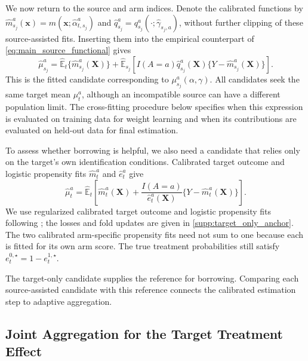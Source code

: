 \documentclass[12pt]{article}
\providecommand{\En}{\widehat{\mathbb E}}
\begin{document}
We now return to the source and arm indices. Denote the calibrated functions by $\widehat m_{s_j}^a(\boldsymbol x)=m(\boldsymbol x;\widehat{\alpha}_{t,s_j}^a)$ and $\widehat q_{s_j}^a=q_{s_j}^a(\cdot;\widehat{\gamma}_{s_j,a})$, without further clipping of these source-assisted fits. Inserting them into the empirical counterpart of \cref{eq:main_source_functional} gives
\begin{equation}\label{eq:source_assisted_mu1}
\widehat\mu_{s_j}^a
=\En_t\{\widehat m_{s_j}^a(\boldsymbol X)\}
+\En_{s_j}\left[I(A=a)\widehat q_{s_j}^a(\boldsymbol X)
\{Y-\widehat m_{s_j}^a(\boldsymbol X)\}\right].
\end{equation}
This is the fitted candidate corresponding to $\mu_{s_j}^a(\alpha,\gamma)$. All candidates seek the same target mean $\mu_t^a$, although an incompatible source can have a different population limit. The cross-fitting procedure below specifies when this expression is evaluated on training data for weight learning and when its contributions are evaluated on held-out data for final estimation.

To assess whether borrowing is helpful, we also need a candidate that relies only on the target's own identification conditions. Calibrated target outcome and logistic propensity fits $\widehat m_t^a$ and $\widehat e_t^a$ give
\begin{equation}\label{eq:target_only_mu}
\widehat\mu_t^a=\En_t\left[
\widehat m_t^a(\boldsymbol X)
+\frac{I(A=a)}{\widehat e_t^a(\boldsymbol X)}
\{Y-\widehat m_t^a(\boldsymbol X)\}\right].
\end{equation}
We use regularized calibrated target outcome and logistic propensity fits following \citet{tan2020model,smucler2019unifying,hou2025efficient}; the losses and fold updates are given in \cref{supp:target_only_anchor}. The two calibrated arm-specific propensity fits need not sum to one because each is fitted for its own arm score. The true treatment probabilities still satisfy $e_t^{0,\star}=1-e_t^{1,\star}$.

The target-only candidate supplies the reference for borrowing. Comparing each source-assisted candidate with this reference connects the calibrated estimation step to adaptive aggregation.

\subsection{Joint Aggregation for the Target Treatment Effect}\label{sec:adaptive_aggregation}
\end{document}
